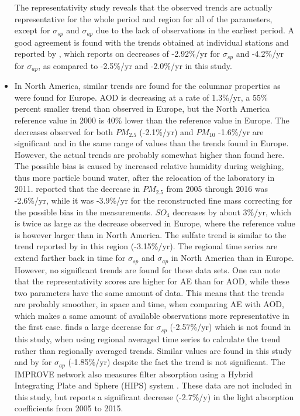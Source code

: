 \documentclass[journal abbreviation, manuscript]{copernicus}
\begin{document}
\begin{itemize}
 The representativity study reveals that the observed trends are actually representative for the whole period and region for all of the parameters, except for $\sigma_{sp}$ and $\sigma_{ap}$ due to the lack of observations in the earliest period. A good agreement is found with the trends obtained at individual stations and reported by \cite{collaudcoenprep}, which reports on decreases of -2.92\%/yr for $\sigma_{sp}$ and -4.2\%/yr for $\sigma_{ap}$, as compared to -2.5\%/yr and -2.0\%/yr in this study.
 \item In North America, similar trends are found for the columnar properties as were found for Europe. AOD is decreasing at a rate of 1.3\%/yr, a 55\% percent smaller trend than observed in Europe, but the North America reference value in 2000 is 40\% lower than the reference value in Europe. The decreases observed for both $PM_{2.5}$ (-2.1\%/yr) and $PM_{10}$ -1.6\%/yr are significant and in the same range of values than the trends found in Europe. However, the actual trends are probably somewhat higher than found here. The possible bias is caused by increased relative humidity during weighing, thus more particle bound water, after the relocation of the laboratory in 2011. \cite{Hand2019} reported that the  decrease in $PM_{2.5}$ from 2005 through 2016 was -2.6\%/yr, while it was -3.9\%/yr for the reconstructed fine mass correcting for the possible bias in the measurements. $SO_{4}$ decreases by about 3\%/yr, which is twice as large as the decrease observed in Europe, where the reference value is however larger than in North America. The sulfate trend is similar to the trend reported by \cite{aas2019global} in this region (-3.15\%/yr). The regional time series are extend farther back in time for $\sigma_{sp}$ and $\sigma_{ap}$ in North America than in Europe. However, no significant trends are found for these data sets. One can note that the representativity scores are higher for AE than for AOD, while these two parameters have the same amount of data. This means that the trends are probably smoother, in space and time, when comparing AE with AOD, which makes a same amount of available observations more representative in the first case. \cite{collaudcoenprep} finds a large decrease for $\sigma_{sp}$ (-2.57\%/yr) which is not found in this study, when using regional averaged time series to calculate the trend rather than regionally averaged trends. Similar values are found in this study and by \cite{collaudcoenprep} for $\sigma_{ap}$ (-1.85\%/yr) despite the fact the trend is not significant. The IMPROVE network also measures filter absorption using a Hybrid Integrating Plate and Sphere (HIPS) system \citep{Warren2016}. These data are not included in this study, but \cite{Warren2016} reports a significant decrease (-2.7\%/y) in the light absorption coefficients from 2005 to 2015.

\end{itemize}
\end{document}

